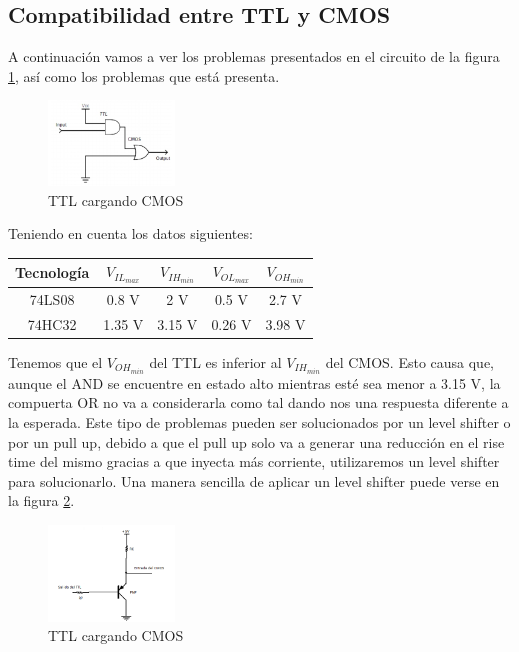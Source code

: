 \subsection{Compatibilidad entre TTL y CMOS}
A continuación vamos a ver los problemas presentados en el circuito de la figura \ref{fig:eje5_1}, así como los problemas que está presenta.

\begin{figure}[H]
	\centering
	\includegraphics[width=0.3\textwidth]{Ejercicio5/TTL_CMOS.png}
	\caption{TTL cargando CMOS}
	\label{fig:eje5_1}
\end{figure}

Teniendo en cuenta los datos siguientes:

\begin{table}[H]
	\centering
	\begin{tabular}{|c|c|c|c|c|}
		\hline
		Tecnología & $V_{IL_{max}}$	& $V_{IH_{min}}$ & $V_{OL_{max}}$ & $V_{OH_{min}}$\\
		\hline
		{74LS08} & 0.8 V & 2 V & 0.5 V & 2.7 V\\
		\hline
		{74HC32} & 1.35 V & 3.15 V & 0.26 V & 3.98 V\\
		\hline
	\end{tabular}
\end{table}

Tenemos que el $V_{OH_{min}}$ del TTL es inferior al $V_{IH_{min}}$ del CMOS. Esto causa que, aunque el AND se encuentre en estado alto mientras esté sea menor a 3.15 V, la compuerta OR no va a considerarla como tal dando nos una respuesta diferente a la esperada.
Este tipo de problemas pueden ser solucionados por un level shifter o por un pull up, debido a que el pull up solo va a generar una reducción en el rise time del mismo gracias a que inyecta más corriente, utilizaremos un level shifter para solucionarlo.
Una manera sencilla de aplicar un level shifter puede verse en la figura \ref{fig:eje5_2}.

\begin{figure}[H]
	\centering
	\includegraphics[width=0.3\textwidth]{Ejercicio5/Levelshifter.png}
	\caption{TTL cargando CMOS}
	\label{fig:eje5_2}
\end{figure}


